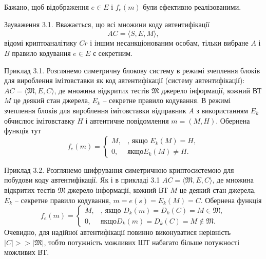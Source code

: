 Бажано, щоб відображення $e \in E$ і $f_e(m)$ були ефективно реалізованими.

\begin{remark}
    Зауваження 3.1. Вважається, що всі множини коду автентифікації
    \begin{equation*}
        AC = \langle \overline{S}, E, M \rangle,
    \end{equation*}
    відомі криптоаналітику $Cr$ і іншим несанкціонованим особам,
    тільки вибране $A$ і $B$ правило кодування $e \in E$ є секретним.
\end{remark}

\begin{example}
    Приклад 3.1. Розглянемо симетричну блокову систему в режимі зчеплення
    блоків для вироблення імітовставки як код автентифікації (систему
    автентифікації): $AC = \langle \mathfrak{M}, E, C \rangle$, де множина відкритих тестів $\mathfrak{M}$ джерело
    інформації, кожний ВТ $M$ це деякий стан джерела, $E_k$ -- секретне правило
    кодування. В режимі зчеплення блоків для вироблення імітовставки
    відправник $A$ з використанням $E_k$ обчислює імітовставку $H$ і автентичне
    повідомлення $m = (M, H)$. Обернена функція тут
    \begin{equation*}
        f_e(m) = \left\{ \begin{array}{ll}
            M, & \text{, якщо } E_k(M) = H,\\
            0, & \text{якщо} E_k(M) \neq H.
        \end{array} \right.
    \end{equation*}
\end{example}

\begin{example}
    Приклад 3.2. Розглянемо шифрування симетричною криптосистемою для
    побудови коду автентифікації. Як і в прикладі 3.1 $AC = \langle \mathfrak{M}, E, C \rangle$, де
    множина відкритих тестів $\mathfrak{M}$ джерело інформації, кожний ВТ $M$ це деякий
    стан джерела, $E_k$ -- секретне правило кодування, $m = e(s) = E_k(M) = C$.
    Обернена функція
    \begin{equation*}
        f_e(m) = \left\{ \begin{array}{ll}
            M, & \text{, якщо } D_k(m) = D_k(C) = M \in \mathfrak{M},\\
            0, & \text{якщо} D_k(m) = D_k(C) = M \not\in \mathfrak{M}.
        \end{array} \right.
    \end{equation*}
    Очевидно, для надійної автентифікації повинно виконуватися нерівність
    $|C| >> |\mathfrak{M}|$, тобто потужність можливих ШТ набагато більше потужності
    можливих ВТ.
\end{example}

